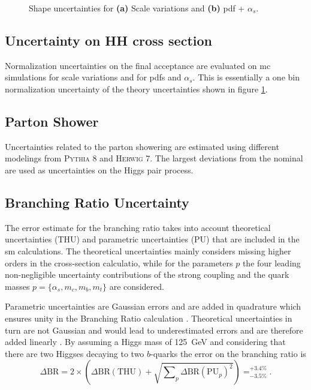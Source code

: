 \begin{figure}
    \centering
    \caption[]{Shape uncertainties for \textbf{(a)} Scale variations and \textbf{(b)} \ac{pdf} + $\alpha_s$.}
    \label{fig:theory_unc}
\end{figure}

\subsection{Uncertainty on HH cross section}
Normalization uncertainties on the final acceptance are evaluated on \ac{mc} simulations for scale variations and for \acp{pdf} and $\alpha_s$. This is essentially a one bin normalization uncertainty of the theory uncertainties shown in figure \ref{fig:theory_unc}.

\subsection{Parton Shower}
Uncertainties related to the parton showering are estimated using different modelings from \textsc{Pythia 8} and \textsc{Herwig 7}. The largest deviations from the nominal are used as uncertainties on the Higgs pair process. 


\subsection{Branching Ratio Uncertainty}
The error estimate for the branching ratio takes into account theoretical uncertainties (THU) and parametric uncertainties (PU) that are included in the \ac{sm} calculations. The theoretical uncertainties mainly considers missing higher orders in the cross-section calculatio, while for the parameters $p$ the four leading non-negligible uncertainty contributions of the strong coupling and the quark masses $p=\{\alpha_s,m_c,m_b,m_t\}$ are considered.

Parametric uncertainties are Gaussian errors and are added in quadrature which ensures unity in the Branching Ratio calculation \citep{de2016arxiv}. Theoretical uncertainties in turn are not Gaussian and would lead to underestimated errors and are therefore added linearly \citep{de2016arxiv}. By assuming a Higgs mass of \qty[]{125}{GeV} and considering that there are two Higgses decaying to two $b$-quarks the error on the branching ratio is
\begin{equation}
    \Delta\text{BR} = 2 \times \left(\Delta\text{BR}(\text{THU}) + \sqrt{\sum\nolimits_{p} \Delta\text{BR}(\text{PU}_{p})^2 }\right) = _{-3.5\%}^{+3.4\%}.
\end{equation}

